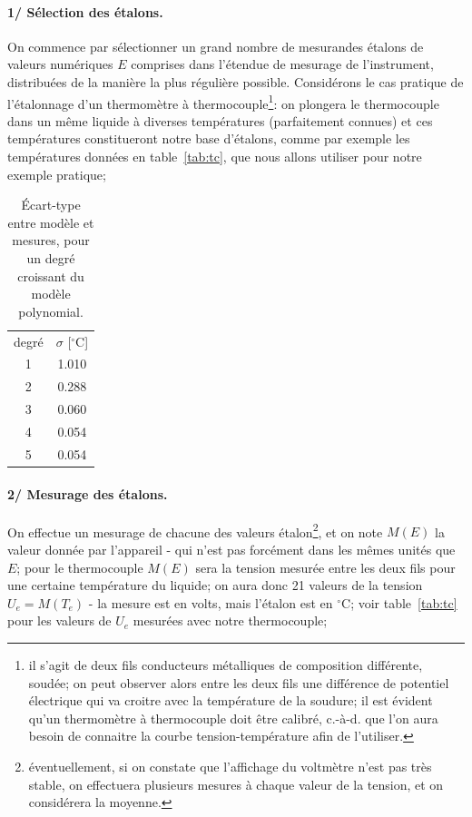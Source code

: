 \paragraph{1/ Sélection des étalons.} On commence par sélectionner un grand nombre de mesurandes étalons de valeurs numériques $E$ comprises dans l'étendue de mesurage de l'instrument, distribuées de la manière la plus régulière possible. Considérons le cas pratique de l'étalonnage d'un thermomètre à thermocouple\footnote{il s'agit de deux fils conducteurs métalliques de composition différente, soudée; on peut observer alors entre les deux fils une différence de potentiel électrique qui va croitre avec la température de la soudure; il est évident qu'un thermomètre à thermocouple doit être calibré, c.-à-d. que l'on aura besoin de connaitre la courbe tension-température afin de l'utiliser.}: on plongera le thermocouple dans un même liquide à diverses températures (parfaitement connues) et ces températures constitueront notre base d'étalons, comme par exemple les températures données en table~\ref{tab:tc}, que nous allons utiliser pour notre exemple pratique;
\begin{table}
    \vspace{-3mm}
    \caption{Écart-type entre modèle et mesures, pour un degré croissant du modèle polynomial.}
    \begin{center}
        \begin{tabular}{c|c}
            degré & $\sigma$ [$^\circ$C] \\
            1     & 1.010                \\
            2     & 0.288                \\
            3     & 0.060                \\
            4     & 0.054                \\
            5     & 0.054
        \end{tabular}
    \end{center}
    \label{tab:tc2}
\end{table}
\paragraph{2/ Mesurage des étalons.} On effectue un mesurage de chacune des valeurs étalon\footnote{éventuellement, si on constate que l'affichage du voltmètre n'est pas très stable, on effectuera plusieurs mesures à chaque valeur de la tension, et on considérera la moyenne.}, et on note $M(E)$ la valeur donnée par l'appareil - qui n'est pas forcément dans les mêmes unités que $E$; pour le thermocouple $M(E)$ sera la tension mesurée entre les deux fils pour une certaine température du liquide; on aura donc 21 valeurs de la tension $U_e=M(T_e)$ - la mesure est en volts, mais l'étalon est en $^\circ$C; voir table~\ref{tab:tc} pour les valeurs de $U_e$ mesurées avec notre thermocouple;


